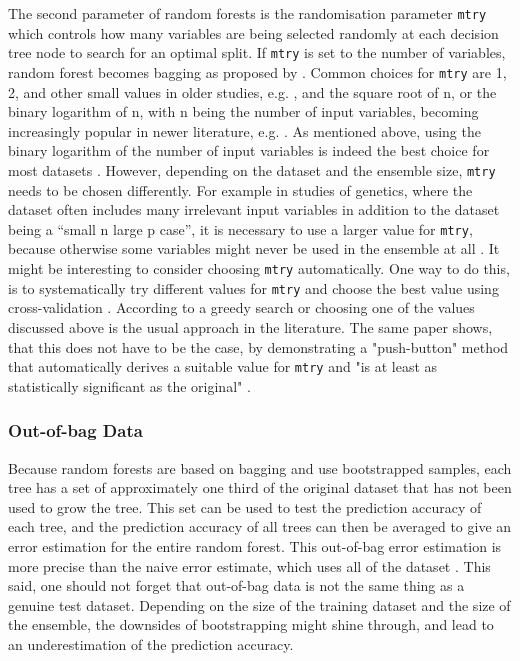 \documentclass[a4paper,man,12pt,apacite,floatsintext]{apa6} %
\begin{document}
The second parameter of random forests is the randomisation parameter
\texttt{mtry} which controls how many variables are being selected randomly
at each decision tree node to search for an optimal split.
If \texttt{mtry} is set to the number of variables, random forest becomes
bagging as proposed by .
Common choices for \texttt{mtry} are 1, 2, and other small values in
older studies, e.g. , and the square root of n,
or the binary logarithm of n, with n being the number of input variables,
becoming increasingly popular in newer literature, e.g.
.
As mentioned above, using the binary logarithm of the number of
input variables is indeed the best choice for most datasets
\cite{banfield2007comparison}.
However, depending on the dataset and the ensemble size, \texttt{mtry}
needs to be chosen differently.
For example in studies of genetics, where the dataset often includes many
irrelevant input variables in addition to the dataset being a
“small n large p case”, it is necessary to use a larger value
for \texttt{mtry}, because otherwise some variables might never be used in the ensemble
at all \cite{strobl2009introduction}.
It might be interesting to consider choosing \texttt{mtry} automatically.
One way to do this, is to systematically try different values for \texttt{mtry}
and choose the best value using cross-validation \cite{psymeth}.
According to  a greedy search or choosing one of
the values discussed above is the usual approach in the literature.
The same paper shows, that this does not have to be the case, by demonstrating
a "push-button" method that automatically derives a suitable value for
\texttt{mtry} and "is at least as statistically significant as the original"
\cite{bernard2008forest}.

\subsubsection{Out-of-bag Data}
Because random forests are based on bagging and use bootstrapped samples,
each tree has a set of approximately one third of the original dataset
that has not been used to grow the tree.
This set can be used to test the prediction accuracy of each tree,
and the prediction accuracy of all trees can then be averaged to give an
error estimation for the entire random forest.
This out-of-bag error estimation is more precise than the naive error
estimate, which uses all of the dataset \cite{strobl2009introduction}.
This said, one should not forget that out-of-bag data is not the
same thing as a genuine test dataset.
Depending on the size of the training dataset and the size of the ensemble,
the downsides
of bootstrapping might shine through, and lead to an underestimation of
the prediction accuracy.
\end{document}
